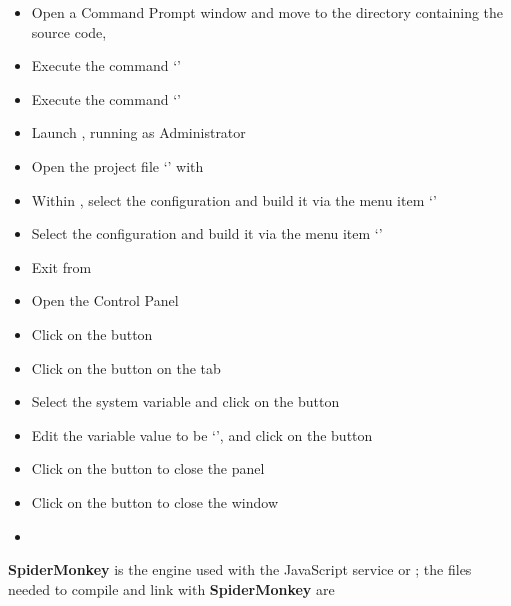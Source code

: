 \tertiaryEnd
{}
\begin{itemize}
\item Open a Command Prompt window and move to the directory containing the \mplusm{}
source code, 
\item\exSp{} Execute the command `'
\item\exSp{} Execute the command `'
\item\exSp{} Launch , running as Administrator
\item\exSp{} Open the project file
`' with
\item\exSp{} Within , select the  configuration and
build it via the menu item `'
\item\exSp{} Select the  configuration and build it via the menu item
`'
\item\exSp{} Exit from 
\item\exSp{} Open the  Control Panel
\item\exSp{} Click on the  button
\item\exSp{} Click on the  button on the 
tab
\item\exSp{} Select the  system variable and click on the 
button 
\item\exSp{} Edit the variable value to be `',
and click on the  button
\item\exSp{} Click on the  button to close the 
panel
\item\exSp{} Click on the  button to close the 
window
\end{itemize}
\tertiaryEnd
{}
\begin{itemize}
\item\TBD
\end{itemize}
\tertiaryEnd
\secondaryEnd
{}
\textbf{SpiderMonkey} is the  engine used with the JavaScript
service or \mplusm{}; the files needed to compile and link with \textbf{SpiderMonkey} are
